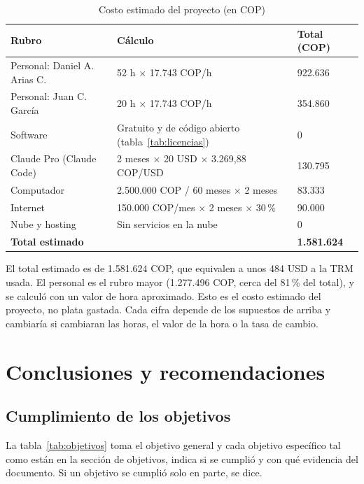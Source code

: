 \documentclass[journal,onecolumn,12pt,draftclsnofoot]{IEEEtran}
\begin{document}
\begin{table}[htbp]
\centering
\caption{Costo estimado del proyecto (en COP)}\label{tab:costos}
\small
\setlength{\tabcolsep}{4pt}
\begin{tabular}{|p{}|p{}|p{}|}
\hline
\textbf{Rubro} & \textbf{Cálculo} & \textbf{Total (COP)} \\ \hline
Personal: Daniel A. Arias C. & 52 h $\times$ 17.743 COP/h & 922.636 \\ \hline
Personal: Juan C. García & 20 h $\times$ 17.743 COP/h & 354.860 \\ \hline
Software & Gratuito y de código abierto (tabla~\ref{tab:licencias}) & 0 \\ \hline
Claude Pro (Claude Code) & 2 meses $\times$ 20 USD $\times$ 3.269,88 COP/USD & 130.795 \\ \hline
Computador & 2.500.000 COP / 60 meses $\times$ 2 meses & 83.333 \\ \hline
Internet & 150.000 COP/mes $\times$ 2 meses $\times$ 30\,\% & 90.000 \\ \hline
Nube y hosting & Sin servicios en la nube & 0 \\ \hline
\textbf{Total estimado} & & \textbf{1.581.624} \\ \hline
\end{tabular}
\end{table}

El total estimado es de 1.581.624 COP, que equivalen a unos 484 USD a la TRM usada. El personal es el rubro mayor (1.277.496 COP, cerca del 81\,\% del total), y se calculó con un valor de hora aproximado. Esto es el costo estimado del proyecto, no plata gastada. Cada cifra depende de los supuestos de arriba y cambiaría si cambiaran las horas, el valor de la hora o la tasa de cambio.

\section{Conclusiones y recomendaciones}

\subsection{Cumplimiento de los objetivos}

La tabla~\ref{tab:objetivos} toma el objetivo general y cada objetivo específico tal como están en la sección de objetivos, indica si se cumplió y con qué evidencia del documento. Si un objetivo se cumplió solo en parte, se dice.
\end{document}
